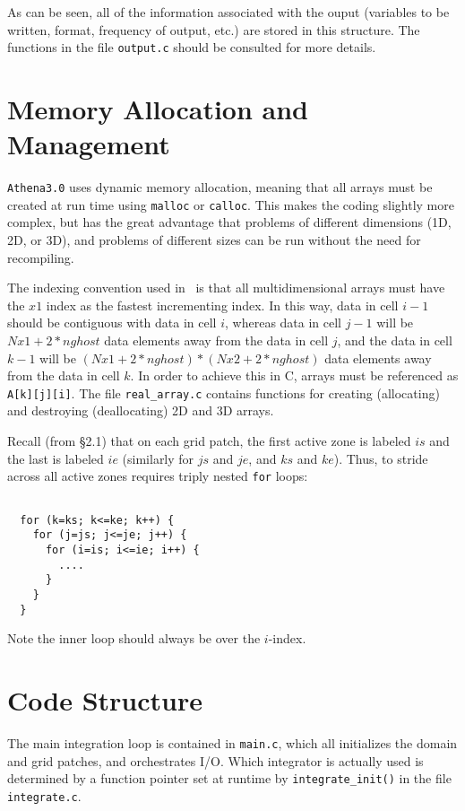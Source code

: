 As can be seen, all of the information associated with the ouput
(variables to be written, format, frequency of output, etc.) are stored
in this structure.  The functions in the file {\tt output.c} should be
consulted for more details.

\section{Memory Allocation and Management}

{\tt Athena3.0} uses dynamic memory allocation, meaning that all arrays must be
created at run time using {\tt malloc} or {\tt calloc}.  This makes the
coding slightly more complex, but has the great advantage that problems
of different dimensions (1D, 2D, or 3D), and problems of different sizes
can be run without the need for recompiling.

The indexing convention used in \ath\ is that all multidimensional
arrays must have the $x1$ index as the fastest incrementing index.
In this way, data in cell $i-1$ should be contiguous with data in cell
$i$, whereas data in cell $j-1$ will be $Nx1 + 2*nghost$ data elements
away from the data in cell $j$, and the data in cell $k-1$ will be
$(Nx1 + 2*nghost)*(Nx2 + 2*nghost)$ data elements away from the data in
cell $k$.  In order to achieve this in C, arrays must be referenced as
{\tt A[k][j][i]}.  The file {\tt real\_array.c} contains functions for
creating (allocating) and destroying (deallocating) 2D and 3D arrays.

Recall (from \S2.1) that on each grid patch, the first active zone is
labeled $is$ and the last is labeled $ie$ (similarly for $js$ and $je$, 
and $ks$ and $ke$).  Thus, to stride across all active zones requires
triply nested {\tt for} loops:
\footnotesize
\begin{verbatim}

  for (k=ks; k<=ke; k++) {
    for (j=js; j<=je; j++) {
      for (i=is; i<=ie; i++) {
        ....
      }
    }
  }

\end{verbatim}
\normalsize
Note the inner loop should always be over the $i$-index.

\section{Code Structure}

The main integration loop is contained in {\tt main.c}, which all
initializes the domain and grid patches, and orchestrates I/O.  Which
integrator is actually used is determined by a function pointer
set at runtime by {\tt integrate\_init()} in the file {\tt integrate.c}.

